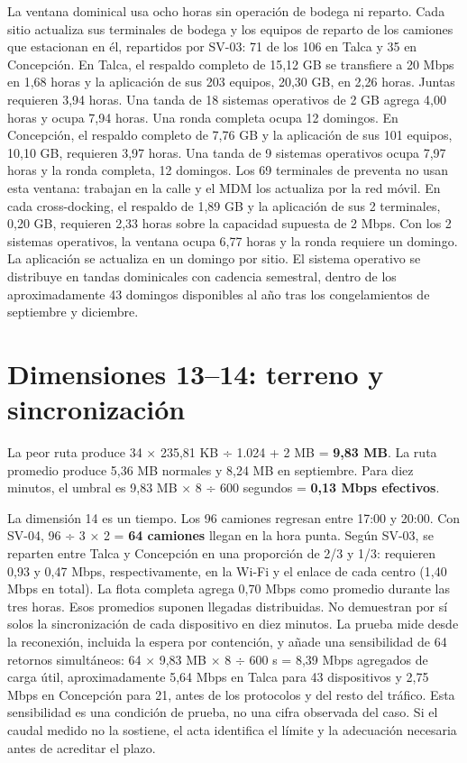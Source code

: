 La ventana dominical usa ocho horas sin operación de bodega ni reparto. Cada sitio actualiza sus terminales de bodega y los equipos de reparto de los camiones que estacionan en él, repartidos por SV-03: 71 de los 106 en Talca y 35 en Concepción. En Talca, el respaldo completo de 15,12 GB se transfiere a 20 Mbps en 1,68 horas y la aplicación de sus 203 equipos, 20,30 GB, en 2,26 horas. Juntas requieren 3,94 horas. Una tanda de 18 sistemas operativos de 2 GB agrega 4,00 horas y ocupa 7,94 horas. Una ronda completa ocupa 12 domingos. En Concepción, el respaldo completo de 7,76 GB y la aplicación de sus 101 equipos, 10,10 GB, requieren 3,97 horas. Una tanda de 9 sistemas operativos ocupa 7,97 horas y la ronda completa, 12 domingos. Los 69 terminales de preventa no usan esta ventana: trabajan en la calle y el MDM los actualiza por la red móvil. En cada cross-docking, el respaldo de 1,89 GB y la aplicación de sus 2 terminales, 0,20 GB, requieren 2,33 horas sobre la capacidad supuesta de 2 Mbps. Con los 2 sistemas operativos, la ventana ocupa 6,77 horas y la ronda requiere un domingo. La aplicación se actualiza en un domingo por sitio. El sistema operativo se distribuye en tandas dominicales con cadencia semestral, dentro de los aproximadamente 43 domingos disponibles al año tras los congelamientos de septiembre y diciembre.

\section{Dimensiones 13–14: terreno y sincronización}
\label{sec:anexo-4b-dimensiones-13-14}

La peor ruta produce 34 × 235,81 KB ÷ 1.024 + 2 MB = \textbf{9,83 MB}. La ruta promedio produce 5,36 MB normales y 8,24 MB en septiembre. Para diez minutos, el umbral es 9,83 MB × 8 ÷ 600 segundos = \textbf{0,13 Mbps efectivos}.

La dimensión 14 es un tiempo. Los 96 camiones regresan entre 17:00 y 20:00. Con SV-04, 96 ÷ 3 × 2 = \textbf{64 camiones} llegan en la hora punta. Según SV-03, se reparten entre Talca y Concepción en una proporción de 2/3 y 1/3: requieren 0,93 y 0,47 Mbps, respectivamente, en la Wi-Fi y el enlace de cada centro (1,40 Mbps en total). La flota completa agrega 0,70 Mbps como promedio durante las tres horas. Esos promedios suponen llegadas distribuidas. No demuestran por sí solos la sincronización de cada dispositivo en diez minutos. La prueba mide desde la reconexión, incluida la espera por contención, y añade una sensibilidad de 64 retornos simultáneos: 64 $\times$ 9,83 MB $\times$ 8 $\div$ 600 s = 8,39 Mbps agregados de carga útil, aproximadamente 5,64 Mbps en Talca para 43 dispositivos y 2,75 Mbps en Concepción para 21, antes de los protocolos y del resto del tráfico. Esta sensibilidad es una condición de prueba, no una cifra observada del caso. Si el caudal medido no la sostiene, el acta identifica el límite y la adecuación necesaria antes de acreditar el plazo.

